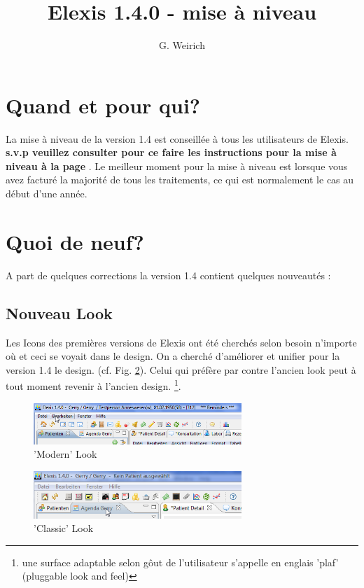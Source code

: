 \documentclass[a4paper]{scrartcl}
\begin{document}
\title{Elexis 1.4.0 - mise à niveau}
\author{G. Weirich}

\maketitle
\tableofcontents

\section{Quand et pour qui?}
La mise à niveau de la version 1.4 est conseillée à tous les utilisateurs de Elexis. \textbf{s.v.p veuillez consulter pour ce faire les instructions pour la mise à niveau à la page \pageref{update}}. Le meilleur moment pour la mise à niveau est lorsque vous avez facturé la majorité de tous les traitements, ce qui est normalement le cas au début d'une année.

\section{Quoi de neuf?}
A part de quelques corrections la version 1.4 contient quelques nouveautés :

\subsection{Nouveau Look}
Les Icons des premières versions de Elexis ont été cherchés selon besoin n'importe où et ceci se voyait dans le design. On a cherché d'améliorer et unifier pour la version 1.4 le design. (cf. Fig. \ref{fig:modern}). Celui qui préfère par contre l'ancien look peut à tout moment revenir à l'ancien design. \footnote{une surface adaptable selon gôut de l'utilisateur s'appelle en englais 'plaf' (pluggable look and feel)}.

\begin{figure}
    \center
  \includegraphics[width=0.7\textwidth]{modern}
  \caption{'Modern' Look}\label{fig:modern}
\end{figure}

\begin{figure}
\center
  \includegraphics[width=0.7\textwidth]{classic}
  \caption{'Classic' Look}\label{fig:modern}
\end{figure}
\end{document}
